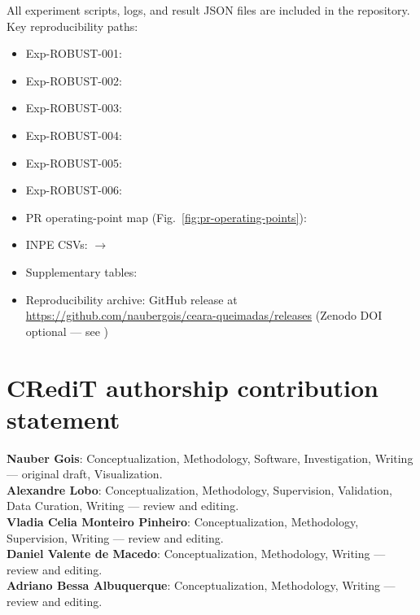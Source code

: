 \documentclass[preprint,12pt,times,numbers]{elsarticle}
\begin{document}
All experiment scripts, logs, and result JSON files are included in the repository. Key reproducibility paths:
\begin{itemize}\setlength{\itemsep}{0.2em}
    \item Exp-ROBUST-001: 
    \item Exp-ROBUST-002: 
    \item Exp-ROBUST-003: 
    \item Exp-ROBUST-004: 
    \item Exp-ROBUST-005: 
    \item Exp-ROBUST-006: 
    \item PR operating-point map (Fig.~\ref{fig:pr-operating-points}): 
    \item INPE CSVs:  $\rightarrow$ 
    \item Supplementary tables: 
    \item Reproducibility archive: GitHub release  at \url{https://github.com/naubergois/ceara-queimadas/releases} (Zenodo DOI optional --- see )
\end{itemize}

\section*{CRediT authorship contribution statement}
\label{sec:credit}

\textbf{Nauber Gois}: Conceptualization, Methodology, Software, Investigation, Writing --- original draft, Visualization.\\
\textbf{Alexandre Lobo}: Conceptualization, Methodology, Supervision, Validation, Data Curation, Writing --- review and editing.\\
\textbf{Vladia Celia Monteiro Pinheiro}: Conceptualization, Methodology, Supervision, Writing --- review and editing.\\
\textbf{Daniel Valente de Macedo}: Conceptualization, Methodology, Writing --- review and editing.\\
\textbf{Adriano Bessa Albuquerque}: Conceptualization, Methodology, Writing --- review and editing.
\end{document}
